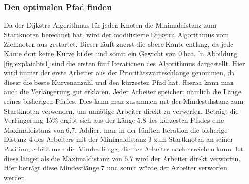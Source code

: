 \documentclass[a4paper,10pt,ngerman]{scrartcl}
\begin{document}
\subsubsection{Den optimalen Pfad finden}
Da der Dijkstra Algorithmus für jeden Knoten die Minimaldistanz zum Startknoten berechnet hat, wird der modifizierte Dijkstra Algorithmus vom Zielknoten aus gestartet.
Dieser läuft zuerst die obere Kante entlang, da jede Kante dort keine Kurve bildet und somit ein Gewicht von 0 hat.
In Abbildung \ref{fig:explainbfs1} sind die ersten fünf Iterationen des Algorithmus dargestellt.
Hier wird immer der erste Arbeiter aus der Prioritätswarteschlange genommen, da dieser die beste Kurvenanzahl und den kürzesten Pfad hat.
Hieran kann man auch die Verlängerung gut erklären. Jeder Arbeiter speichert nämlich die Länge seines bisherigen Pfades.
Dies kann man zusammen mit der Mindestdistanz zum Startknoten verwenden, um unnötige Arbeiter direkt zu verwerfen.
Beträgt die Verlängerung 15\% ergibt sich aus der Länge 5,8 des kürzesten Pfades eine Maximaldistanz von 6,7.
Addiert man in der fünften Iteration die bisherige Distanz 4 des Arbeiters mit der Minimaldistanz 3 zum Startknoten an seiner Position,
erhält man die Mindestlänge, die der Arbeiter noch erreichen kann. Ist diese länger als die Maximaldistanz von 6,7 wird der Arbeiter direkt verworfen.
Hier beträgt diese Mindestlänge 7 und somit würde der Arbeiter verworfen werden.
\end{document}
